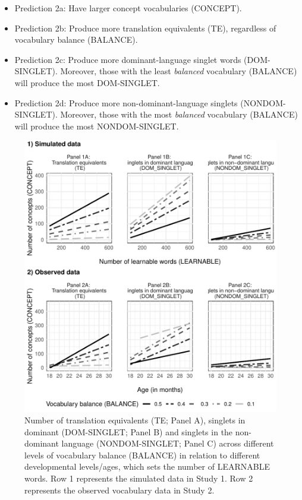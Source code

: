 \documentclass[
  english,
  ,man,floatsintext]{apa6}
\providecommand{\tightlist}{%
  \setlength{\itemsep}{0pt}\setlength{\parskip}{0pt}}
\begin{document}
\begin{itemize}
\tightlist
\item
  Prediction 2a: Have larger concept vocabularies (CONCEPT).
\item
  Prediction 2b: Produce more translation equivalents (TE), regardless of vocabulary balance (BALANCE).
\item
  Prediction 2c: Produce more dominant-language singlet words (DOM-SINGLET). Moreover, those with the least \emph{balanced} vocabulary (BALANCE) will produce the most DOM-SINGLET.
\item
  Prediction 2d: Produce more non-dominant-language singlets (NONDOM-SINGLET). Moreover, those with the most \emph{balanced} vocabulary (BALANCE) will produce the most NONDOM-SINGLET.
\end{itemize}

\begin{figure}[H]

{\centering \includegraphics[width=0.8\linewidth]{paper_TE_bilingual_vocabulary_model_files/figure-latex/fig2-1} 

}

\caption{Number of translation equivalents (TE; Panel A), singlets in dominant (DOM-SINGLET; Panel B) and singlets in the non-dominant language (NONDOM-SINGLET; Panel C) across different levels of vocabulary balance (BALANCE) in relation to different developmental levels/ages, which sets the number of LEARNABLE words. Row 1 represents the simulated data in Study 1. Row 2 represents the observed vocabulary data in Study 2.}\label{fig:fig2}
\end{figure}
\end{document}
